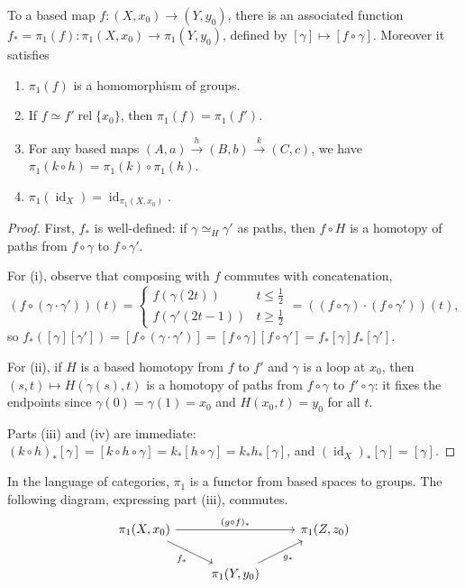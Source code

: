 \documentclass[a4paper]{scrartcl}
\newcommand{\id}{\operatorname{id}}
\newcommand{\rel}{\operatorname{rel}}
\begin{document}
\begin{proposition}[$\pi_1$ is a Functor] \label{prop:functor}
	To a based map $f: (X, x_0) \rightarrow (Y, y_0)$, there is an associated function
	$f_* = \pi_1(f): \pi_1(X, x_0) \rightarrow \pi_1(Y, y_0)$, defined by $[\gamma] \mapsto [f \circ \gamma]$. Moreover it satisfies
	\begin{enumerate}
		\item $\pi_1(f)$ is a homomorphism of groups.
		\item If $f \simeq f' \rel \{x_0\}$, then $\pi_1(f) = \pi_1(f')$.
		\item For any based maps $(A, a) \stackrel{h}{\longrightarrow}(B, b) \stackrel{k}{\longrightarrow}(C, c)$, we have $\pi_1(k \circ h)= \pi_1(k) \circ \pi_1(h)$.
		\item $\pi_1(\id_X) = \id_{\pi_1(X, x_0)}$.
	\end{enumerate}
\end{proposition}
\begin{proof}
	First, $f_*$ is well-defined: if $\gamma \simeq_H \gamma'$ as paths, then $f \circ H$ is a homotopy of paths from $f \circ \gamma$ to $f \circ \gamma'$.

	For (i), observe that composing with $f$ commutes with concatenation,
	$$
	(f \circ (\gamma \cdot \gamma'))(t) = \begin{cases} f(\gamma(2t)) & t \leq \tfrac12 \\ f(\gamma'(2t-1)) & t \geq \tfrac12\end{cases} = ((f\circ\gamma)\cdot(f\circ\gamma'))(t),
	$$
	so $f_*([\gamma][\gamma']) = [f \circ (\gamma\cdot\gamma')] = [f\circ\gamma][f\circ\gamma'] = f_*[\gamma] f_*[\gamma']$.

	For (ii), if $H$ is a based homotopy from $f$ to $f'$ and $\gamma$ is a loop at $x_0$, then $(s,t) \mapsto H(\gamma(s), t)$ is a homotopy of paths from $f \circ \gamma$ to $f' \circ \gamma$: it fixes the endpoints since $\gamma(0) = \gamma(1) = x_0$ and $H(x_0, t) = y_0$ for all $t$.

	Parts (iii) and (iv) are immediate: $(k \circ h)_*[\gamma] = [k \circ h \circ \gamma] = k_*[h \circ \gamma] = k_*h_*[\gamma]$, and $(\id_X)_*[\gamma] = [\gamma]$.
\end{proof}

In the language of categories, $\pi_1$ is a functor from based spaces to groups. The
following diagram, expressing part (iii), commutes.
\[\begin{tikzcd}
	{\pi_1(X,x_0)} \arrow[rr, "{(g \circ f)_*}"] \arrow[rd, "f_*"'] & & {\pi_1(Z,z_0)} \\
	& {\pi_1(Y,y_0)} \arrow[ru, "g_*"'] &
\end{tikzcd}\]
\end{document}
